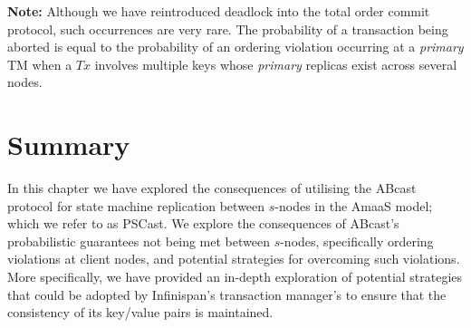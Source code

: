     \textbf{Note:} Although we have reintroduced deadlock into the total order commit protocol, such occurrences are very rare.  The probability of a transaction being aborted is equal to the probability of an ordering violation occurring at a \emph{primary} TM when a $Tx$ involves multiple keys whose \emph{primary} replicas exist across several nodes.  

\section{Summary}
In this chapter we have explored the consequences of utilising the \textsf{ABcast} protocol for state machine replication between $s$-nodes in the \textsf{AmaaS} model; which we refer to as \textsf{PSCast}.  We explore the consequences of \textsf{ABcast}'s probabilistic guarantees not being met between $s$-nodes, specifically ordering violations at client nodes, and potential strategies for overcoming such violations.  More specifically, we have provided an in-depth exploration of potential strategies that could be adopted by Infinispan's transaction manager's to ensure that the consistency of its key/value pairs is maintained.  